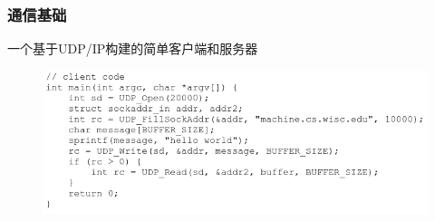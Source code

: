 \begin{frame}[fragile]
    \frametitle{通信基础}
一个基于UDP/IP构建的简单客户端和服务器
            \begin{figure}
    \includegraphics[width=1.\linewidth]{figs/udp-client.png}
\end{figure}
\end{frame}

